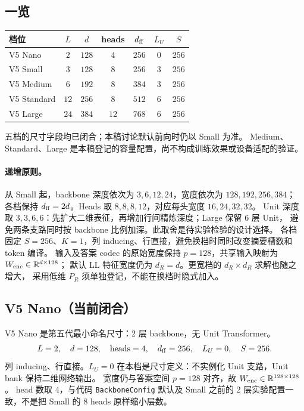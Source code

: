 \documentclass[11pt,UTF8,fontset=fandol]{ctexart}
\numberwithin{equation}{section}
\theoremstyle{definition}
\newcommand{\R}{\mathbb R}
\begin{document}
\subsection{一览}
\begin{center}\small
\begin{tabularx}{\linewidth}{lcccccc}
\toprule
档位 & $L$ & $d$ & heads & $d_{\rm ff}$ & $L_U$ & $S$\\\midrule
V5 Nano & $2$ & $128$ & $4$ & $256$ & $0$ & $256$\\
V5 Small & $3$ & $128$ & $8$ & $256$ & $3$ & $256$\\
V5 Medium & $6$ & $192$ & $8$ & $384$ & $3$ & $256$\\
V5 Standard & $12$ & $256$ & $8$ & $512$ & $6$ & $256$\\
V5 Large & $24$ & $384$ & $12$ & $768$ & $6$ & $256$\\
\bottomrule
\end{tabularx}
\end{center}
五档的尺寸字段均已闭合；本稿讨论默认前向时仍以 Small 为准。
Medium、Standard、Large 是本稿登记的容量配置，尚不构成训练效果或设备适配的验证。

\paragraph{递增原则。}
从 Small 起，backbone 深度依次为 $3,6,12,24$，宽度依次为 $128,192,256,384$；
各档保持 $d_{\rm ff}=2d$。Heads 取 $8,8,8,12$，对应每头宽度 $16,24,32,32$。
Unit 深度取 $3,3,6,6$：先扩大二维表征，再增加行间精炼深度；Large 保留 6 层 Unit，
避免两条支路同时按 backbone 比例加深。此取舍是待实验检验的设计选择。
各档固定 $S=256$、$K=1$，列 inducing、行直接，避免换档时同时改变摘要槽数和 token 编译。
输入及答案 codec 的原始宽度保持 $p=128$，共享输入映射为 $W_{\rm enc}\in\R^{d\times128}$；
默认 LL 特征宽度仍为 $d_R=d$。更宽档的 $d_R\times d_R$ 求解也随之增大，
采用低维 $P_R$ 须单独登记，不能在换档时隐式加入。

\subsection{V5 Nano（当前闭合）}
\label{v54:subsec:size-nano}
V5 Nano 是第五代最小命名尺寸：2 层 backbone，无 Unit Transformer。
\begin{equation}
 L=2,\quad d=128,\quad \mathrm{heads}=4,\quad
 d_{\rm ff}=256,\quad L_U=0,\quad S=256.
 \label{v54:eq:v5-nano}
\end{equation}
列 inducing、行直接。$L_U=0$ 在本档是尺寸定义：不实例化 Unit 支路，Unit bank 保持二维网络输出。
宽度仍与答案空间 $p=128$ 对齐，故 $W_{\rm enc}\in\R^{128\times128}$。
head 数取 4，与代码 \texttt{BackboneConfig} 默认及 Small 之前的 2 层实验配置一致，不是把 Small 的 8 heads 原样缩小层数。
\end{document}
